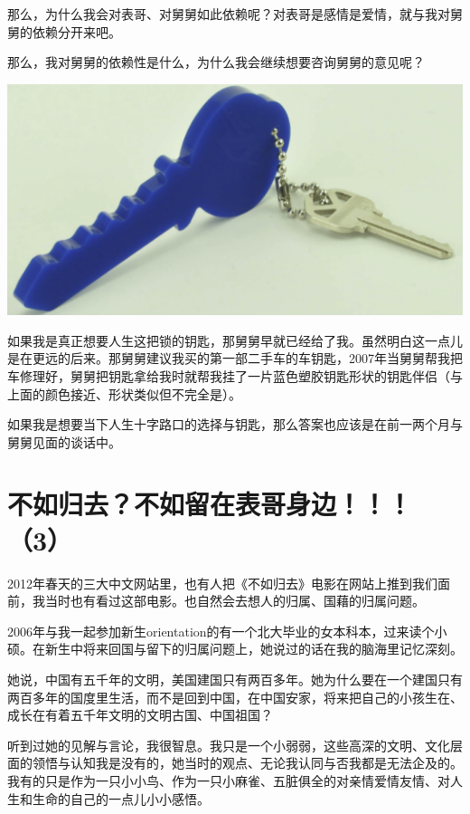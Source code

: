\documentclass[9pt, b5paper]{article}
\begin{document}
那么，为什么我会对表哥、对舅舅如此依赖呢？对表哥是感情是爱情，就与我对舅舅的依赖分开来吧。

那么，我对舅舅的依赖性是什么，为什么我会继续想要咨询舅舅的意见呢？

\begin{center}
\includegraphics[width=.9\linewidth]{./pic/backups_plans_20210415_113132.png}
\end{center}

如果我是真正想要人生这把锁的钥匙，那舅舅早就已经给了我。虽然明白这一点儿是在更远的后来。那舅舅建议我买的第一部二手车的车钥匙，2007年当舅舅帮我把车修理好，舅舅把钥匙拿给我时就帮我挂了一片蓝色塑胶钥匙形状的钥匙伴侣（与上面的颜色接近、形状类似但不完全是）。

如果我是想要当下人生十字路口的选择与钥匙，那么答案也应该是在前一两个月与舅舅见面的谈话中。 

\section{不如归去？不如留在表哥身边！！！（3）}
\label{sec:orgac0fff0}

2012年春天的三大中文网站里，也有人把《不如归去》电影在网站上推到我们面前，我当时也有看过这部电影。也自然会去想人的归属、国藉的归属问题。 

2006年与我一起参加新生orientation的有一个北大毕业的女本科本，过来读个小硕。在新生中将来回国与留下的归属问题上，她说过的话在我的脑海里记忆深刻。

她说，中国有五千年的文明，美国建国只有两百多年。她为什么要在一个建国只有两百多年的国度里生活，而不是回到中国，在中国安家，将来把自己的小孩生在、成长在有着五千年文明的文明古国、中国祖国？

听到过她的见解与言论，我很智息。我只是一个小弱弱，这些高深的文明、文化层面的领悟与认知我是没有的，她当时的观点、无论我认同与否我都是无法企及的。我有的只是作为一只小小鸟、作为一只小麻雀、五脏俱全的对亲情爱情友情、对人生和生命的自己的一点儿小小感悟。
\end{document}
